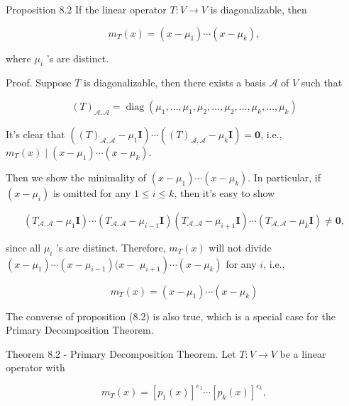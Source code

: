 \documentclass[11pt]{article}
\begin{document}
Proposition 8.2 If the linear operator \(T : V \rightarrow  V\) is diagonalizable, then

\[
{m}_{T}\left( x\right)  = \left( {x - {\mu }_1}\right) \cdots \left( {x - {\mu }_{k}}\right) ,
\]

where \({\mu }_{i}\) ’s are distinct.

Proof. Suppose \(T\) is diagonalizable, then there exists a basis \(\mathcal{A}\) of \(V\) such that

\[
{\left( T\right) }_{\mathcal{A},\mathcal{A}} = \operatorname{diag}\left( {{\mu }_1,\ldots ,{\mu }_1,{\mu }_2,\ldots ,{\mu }_2,\ldots ,{\mu }_{k},\ldots ,{\mu }_{k}}\right)
\]

It’s clear that \(\left( {{\left( T\right) }_{\mathcal{A},\mathcal{A}} - {\mu }_1\mathbf{I}}\right) \cdots \left( {{\left( T\right) }_{\mathcal{A},\mathcal{A}} - {\mu }_{k}\mathbf{I}}\right)  = \mathbf{0}\), i.e., \({m}_{T}\left( x\right)  \mid  \left( {x - {\mu }_1}\right) \cdots \left( {x - {\mu }_{k}}\right)\).

Then we show the minimality of \(\left( {x - {\mu }_1}\right) \cdots \left( {x - {\mu }_{k}}\right)\). In particular, if \(\left( {x - {\mu }_{i}}\right)\) is omitted for any \(1 \leq  i \leq  k\), then it’s easy to show

\[
\left( {{T}_{\mathcal{A},\mathcal{A}} - {\mu }_1\mathbf{I}}\right) \cdots \left( {{T}_{\mathcal{A},\mathcal{A}} - {\mu }_{i - 1}\mathbf{I}}\right) \left( {{T}_{\mathcal{A},\mathcal{A}} - {\mu }_{i + 1}\mathbf{I}}\right) \cdots \left( {{T}_{\mathcal{A},\mathcal{A}} - {\mu }_{k}\mathbf{I}}\right)  \neq  \mathbf{0},
\]

since all \({\mu }_{i}\) ’s are distinct. Therefore, \({m}_{T}\left( x\right)\) will not divide \(\left( {x - {\mu }_1}\right) \cdots \left( {x - {\mu }_{i - 1}}\right) (x -\)  \(\left. {\mu }_{i + 1}\right) \cdots \left( {x - {\mu }_{k}}\right)\) for any \(i\), i.e.,

\[
{m}_{T}\left( x\right)  = \left( {x - {\mu }_1}\right) \cdots \left( {x - {\mu }_{k}}\right)
\]

The converse of proposition (8.2) is also true, which is a special case for the Primary Decomposition Theorem.

Theorem 8.2 - Primary Decomposition Theorem. Let \(T : V \rightarrow  V\) be a linear operator with

\[
{m}_{T}\left( x\right)  = {\left\lbrack  {p}_1\left( x\right) \right\rbrack  }^{{e}_1}\cdots {\left\lbrack  {p}_{k}\left( x\right) \right\rbrack  }^{{e}_{k}},
\]
\end{document}
